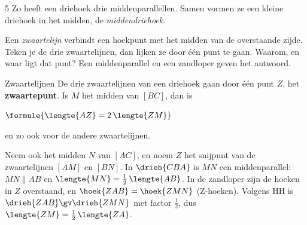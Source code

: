 \begin{alleenvoor}{5}
Zo heeft een driehoek drie middenparallellen. Samen vormen ze een kleine driehoek in het midden, de \emph{middendriehoek}.


Een \emph{zwaartelijn} verbindt een hoekpunt met het midden van de overstaande zijde. Teken je de drie zwaartelijnen, dan lijken ze door één punt te gaan. Waarom, en waar ligt dat punt? Een middenparallel en een zandloper geven het antwoord.

\begin{theorie}
\begin{minipage}[t]{.62\linewidth}
\vspace{0pt}
\begin{stelling}{Zwaartelijnen}
De drie zwaartelijnen van een driehoek gaan door één punt $Z$, het \textbf{\textcolor{accent}{zwaartepunt}}. Is $M$ het midden van $[BC]$, dan is

\vspace{1mm}
\qquad $\formule{\lengte{AZ} = 2\,\lengte{ZM}}$

\vspace{1mm}
en zo ook voor de andere zwaartelijnen.
\end{stelling}

\begin{bewijs}
Neem ook het midden $N$ van $[AC]$, en noem $Z$ het snijpunt van de zwaartelijnen $[AM]$ en $[BN]$. In $\drieh{CBA}$ is $MN$ een middenparallel: $MN \parallel AB$ en $\lengte{MN} = \tfrac12\,\lengte{AB}$. In de zandloper zijn de hoeken in $Z$ overstaand, en $\hoek{ZAB} = \hoek{ZMN}$ (Z-hoeken). Volgens HH is $\drieh{ZAB} \gv \drieh{ZMN}$ met factor $\tfrac12$, dus $\lengte{ZM} = \tfrac12\,\lengte{ZA}$.


\end{bewijs}
\end{minipage}
\end{theorie}
\end{alleenvoor}
